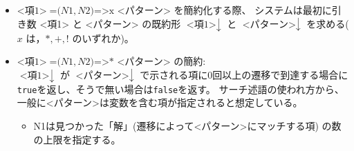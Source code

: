 \documentclass{article}
\begin{document}
\begin{itemize}
\item $\mbox{<項1>}\; \mbox{=(}N1, N2\mbox{)=>x <パターン>}$ を簡約化する際、
      システムは最初に引き数 <項1> と <パターン> の既約形 $\mbox{<項1>}\downarrow$ と
      $\mbox{<パターン>}\downarrow$ を求める($x$ は，$*, +, !$  のいずれか)。

\item $\mbox{<項1>}\; \mbox{=(}N1, N2\mbox{)=>* <パターン>}$ の簡約:\\
      $\mbox{<項1>}\downarrow$ が $\mbox{<パターン>}\downarrow$ で示される項に0回以上の遷移で到達する場合に\texttt{true}を返し、そうで無い場合は\texttt{false}を返す。
サーチ述語の使われ方から、一般に<パターン>は変数を含む項が指定されると想定している。
\begin{itemize}
\item N1は見つかった「解」(遷移によって<パターン>にマッチする項) の数の上限を指定する。


\end{itemize}
\end{itemize}
\end{document}
